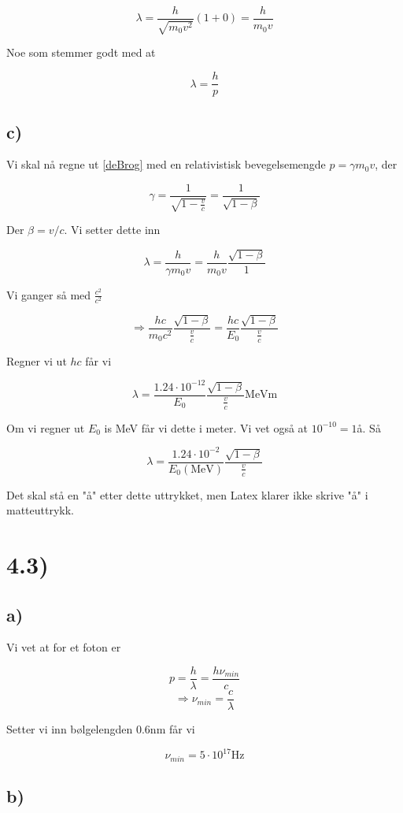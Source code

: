 \documentclass[a4paper,norsk, 10pt]{article}
\begin{document}
$$
\lambda = \frac{h}{\sqrt{m_0v^2}}(1+0) = \frac{h}{m_0v}
$$

Noe som stemmer godt med at 

$$
\lambda = \frac{h}{p}
$$

\subsection*{c)}

Vi skal nå regne ut \ref{deBrog} med en relativistisk bevegelsemengde $p = \gamma m_0v$, der 

$$
\gamma = \frac{1}{\sqrt{1-\frac{v}{c}}} = \frac{1}{\sqrt{1-\beta}}
$$

Der $\beta = v/c$. Vi setter dette inn

$$
\lambda = \frac{h}{\gamma m_0 v} = \frac{h}{m_0 v}\frac{\sqrt{1-\beta}}{1}
$$

Vi ganger så med $\frac{c^2}{c^2}$

$$
\Rightarrow \frac{hc}{m_0 c^2}\frac{\sqrt{1-\beta}}{\frac{v}{c}} = \frac{hc}{E_0}\frac{\sqrt{1-\beta}}{\frac{v}{c}}
$$

Regner vi ut $hc$ får vi

$$
\lambda = \frac{1.24\cdot 10^{-12}}{E_0}\frac{\sqrt{1-\beta}}{\frac{v}{c}} \mathrm{MeV m}
$$

Om vi regner ut $E_0$ is MeV får vi dette i meter. Vi vet også at $10^{-10} = 1$å. Så

$$
\lambda = \frac{1.24\cdot 10^{-2}}{E_0(\mathrm{MeV})}\frac{\sqrt{1-\beta}}{\frac{v}{c}} 
$$
 
Det skal stå en "å" etter dette uttrykket, men Latex klarer ikke skrive "å" i matteuttrykk.

\section*{4.3)}
\subsection*{a)}
Vi vet at for et foton er 

$$
p = \frac{h}{\lambda} = \frac{h\nu_{min}}{c}
$$
$$
\Rightarrow \nu_{min} = \frac{c}{\lambda} 
$$

Setter vi inn bølgelengden $0.6$nm får vi 

$$
\nu_{min} = 5\cdot 10^{17} \mathrm{Hz}
$$

\subsection*{b)}
\end{document}
